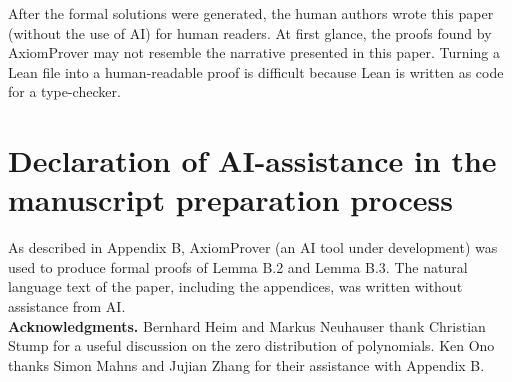 \documentclass[11pt,reqno]{amsart}
\theoremstyle{plain}
\theoremstyle{remark}
\theoremstyle{definition}
\numberwithin{equation}{section}
\begin{document}
After the formal solutions were generated, the human authors wrote this paper
(without the use of AI) for human readers.
At first glance, the proofs found by AxiomProver may not resemble the narrative presented in this paper.
Turning a Lean file into a human-readable proof is difficult
because Lean is written as code for a type-checker.

\section*{Declaration of AI-assistance in the manuscript preparation process}
As described in Appendix B,
AxiomProver (an AI tool under development)
was used to produce formal proofs of Lemma B.2 and Lemma B.3.
The natural language text of the paper, including the appendices, was written without assistance from AI.
\ \\











\noindent
{\bf Acknowledgments.}
Bernhard Heim and Markus Neuhauser thank Christian Stump for a useful discussion on the zero distribution of polynomials. Ken Ono thanks Simon Mahns and Jujian Zhang for their assistance with Appendix B.
\end{document}

